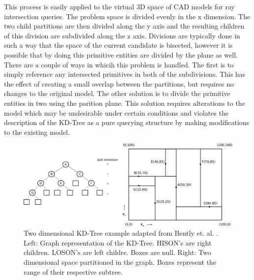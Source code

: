 \documentclass[12pt, a4paper]{article}
\begin{document}
This process is easily applied to the virtual 3D space of CAD models for ray intersection queries. The problem space is divided evenly in the x dimension. The two child partitions are then divided along the y axis and the resulting children of this division are subdivided along the z axis. Divisions are typically done in such a way that the space of the current candidate is bisected, however it is possible that by doing this primitive entities are divided by the plane as well. There are a couple of ways in whicih this problem is handled. The first is to simply reference any intersected primitives in both of the subdivisions. This has the effect of creating a small overlap between the partitions, but requires no changes to the original model. The other solution is to divide the primitive entities in two using the parition plane.  This solution requires alterations to the model which may be undesirable under certain conditions and violates the description of the KD-Tree as a pure querying structure by making modifications to the existing model.

\begin{figure}[H]
  \caption{Two dimensional KD-Tree example adapted from Bently et. al. \cite{Bentley_1975}. Left: Graph representation of the KD-Tree. HISON's are right children. LOSON's are left childre. Boxes are null. Right: Two dimensional space partitioned in the graph. Boxes represent the range of their respective subtree.}
  \label{2dkd}
  \includegraphics[scale=0.25]{2d_kd_eg.png}
\end{figure}
\end{document}
